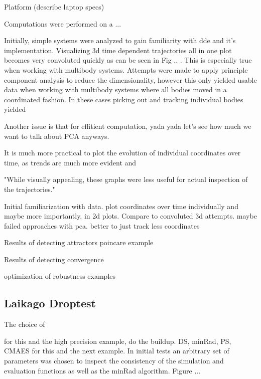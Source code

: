     Platform (describe laptop specs)

    Computations were performed on a ...

    Initially, simple systems were analyzed to gain familiarity with dde and it's implementation. Visualizing 3d time dependent trajectories all in one plot becomes very convoluted quickly as can be seen in Fig .. . This is especially true when working with multibody systems. Attempts were made to apply principle component analysis to reduce the dimensionality, however this only yielded usable data when working with multibody systems where all bodies moved in a coordinated fashion. In these cases picking out and tracking individual bodies yielded


    Another issue is that for effitient computation, yada yada let's see how much we want to talk about PCA anyways.  

    It is much more practical to plot the evolution of individual coordinates over time, as trends are much more evident and 

    "While visually appealing, these graphs were less useful for actual inspection of the trajectories."

    Initial familiarization with data.
        plot coordinates over time individually and maybe more importantly, in 2d plots. Compare to convoluted 3d attempts. 
        maybe failed approaches with pca. better to just track less coordinates


    Results of detecting attractors
        poincare example

    Results of detecting convergence


    optimization of robustness examples

    \subsection{Laikago Droptest}

    The choice of 

        for this and the high precision example, do the buildup. 
        DS, minRad, PS, CMAES for this and the next example. 
        In initial tests an arbitrary set of parameters was chosen to inspect the consistency of the simulation and evaluation functions as well as the minRad algorithm. 
        Figure ... 

